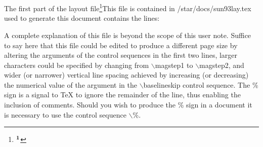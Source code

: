 The first part of the layout file\footnote{$\bf^1$}{This file is
contained in /star/docs/sun93lay.tex} used to generate this document
contains the lines:
\medskip
\tt
{}


\rm
A complete explanation of this file is beyond the scope of this
user note.
Suffice to say here that this file could be edited to produce a different
page size by altering the arguments of the control sequences in the first two
lines, larger characters could be specified by changing from $\backslash$magstep1 to
$\backslash$magstep2, and wider (or narrower) vertical line spacing achieved
by increasing
(or decreasing) the numerical value of the argument in the
$\backslash$baselineskip control sequence.
The \% sign is a signal to {\TeX} to ignore the remainder of the line,
thus enabling the inclusion of comments.
Should you wish to produce the \% sign in a document it is necessary to use the
control sequence $\backslash$\%.

